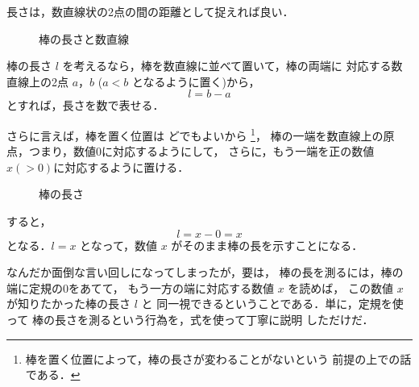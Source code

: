                 長さは，数直線状の2点の間の距離として捉えれば良い．
                    \begin{figure}[hbt]
                        \begin{center}
                            \caption{棒の長さと数直線}
                            \label{fig:NagasaToSuuchokusen}
                        \end{center}
                    \end{figure}

                棒の長さ $l$ を考えるなら，棒を数直線に並べて置いて，棒の両端に
                対応する数直線上の2点 $a$，$b$ ($a<b$ となるように置く)から，
                    \begin{equation*}
                        l = b - a
                    \end{equation*}
                とすれば，長さを数で表せる．

                さらに言えば，棒を置く位置は
                どでもよいから
                    \footnote{
                        棒を置く位置によって，棒の長さが変わることがないという
                        前提の上での話である．
                    }，
                棒の一端を数直線上の原点，つまり，数値0に対応するようにして，
                さらに，もう一端を正の数値 $x(>0)$に対応するように置ける．
                    \begin{figure}[hbt]
                        \begin{center}
                            \caption{棒の長さ}
                            \label{fig:NagasaToSuuchokusen_0}
                        \end{center}
                    \end{figure}

                すると，
                    \begin{equation*}
                        l = x - 0 = x
                    \end{equation*}
                となる．$l=x$ となって，数値 $x$ がそのまま棒の長を示すことになる．

                なんだか面倒な言い回しになってしまったが，要は，
                棒の長を測るには，棒の端に定規の0をあてて，
                もう一方の端に対応する数値 $x$ を読めば，
                この数値 $x$ が知りたかった棒の長さ $l$ と
                同一視できるということである．単に，定規を使って
                棒の長さを測るという行為を，式を使って丁寧に説明
                しただけだ．

